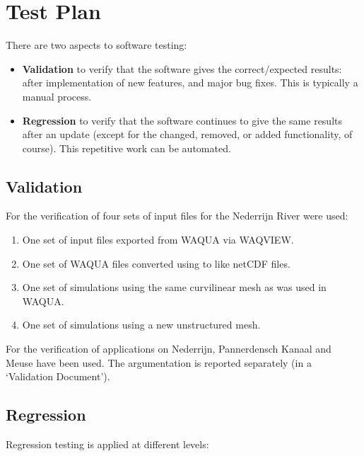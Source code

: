 \chapter{Test Plan} \label{Chp:TestPlan}

There are two aspects to software testing:

\begin{itemize}
\item \textbf{Validation} to verify that the software gives the correct/expected results: after implementation of new features, and major bug fixes.
This is typically a manual process.
\item \textbf{Regression} to verify that the software continues to give the same results after an update (except for the changed, removed, or added functionality, of course).
This repetitive work can be automated.
\end{itemize}


\section{Validation}

For the verification of  four sets of input files for the Nederrijn River were used:

\begin{enumerate}
\item One set of input files exported from WAQUA via WAQVIEW.
\item One set of WAQUA files converted using  to \dflowfm like netCDF files.
\item One set of \dflowfm simulations using the same curvilinear mesh as was used in WAQUA.
\item One set of \dflowfm simulations using a new unstructured mesh.
\end{enumerate}

For the verification of  applications on Nederrijn, Pannerdensch Kanaal and Meuse have been used.
The argumentation is reported separately (in a `Validation Document').


\section{Regression}

Regression testing is applied at different levels:

